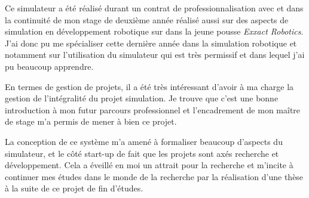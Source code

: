 		Ce simulateur a été réalisé durant un contrat de professionnalisation avec \forssea{} et dans la continuité de mon stage de deuxième année réalisé aussi sur des aspects de simulation en développement robotique sur \gazebo{} dans la jeune pousse \textit{Exxact Robotics}. J'ai donc pu me spécialiser cette dernière année dans la simulation robotique et notamment sur l'utilisation du simulateur \gazebo{} qui est très permissif et dans lequel j'ai pu beaucoup apprendre.

		En termes de gestion de projets, il a été très intéressant d'avoir à ma charge la gestion de l'intégralité du projet simulation. Je trouve que c'est une bonne introduction à mon futur parcours professionnel et l'encadrement de mon maître de stage m'a permis de mener à bien ce projet.

		La conception de ce système m'a amené à formaliser beaucoup d'aspects du simulateur, et le côté start-up de \forssea{} fait que les projets sont axés recherche et développement. Cela a éveillé en moi un attrait pour la recherche et m'incite à continuer mes études dans le monde de la recherche par la réalisation d'une thèse à la suite de ce projet de fin d'études.